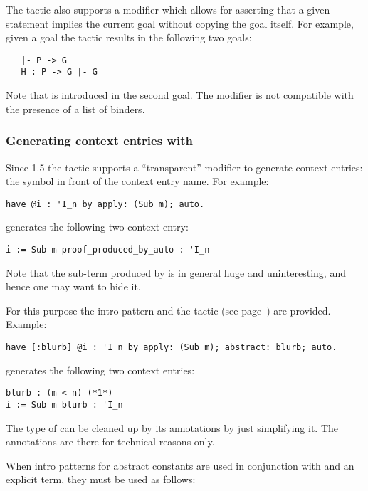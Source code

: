 The  tactic also supports a  modifier which allows for
asserting that a given statement implies the current goal without
copying the goal itself. For example, given a goal  the tactic
 results in the following two goals:
\begin{lstlisting}
   |- P -> G
   H : P -> G |- G
\end{lstlisting}
Note that  is introduced in the second goal. The 
modifier is not compatible with the presence of a list of binders.

\subsubsection*{Generating  context entries with }
\label{sec:havetransparent}

Since \ssr{} 1.5 the  tactic supports a ``transparent'' modifier to
generate  context entries: the  symbol in front of the context
entry name.  For example:

\begin{lstlisting}
have @i : 'I_n by apply: (Sub m); auto.
\end{lstlisting}
generates the following two context entry:
\begin{lstlisting}
i := Sub m proof_produced_by_auto : 'I_n
\end{lstlisting}

Note that the sub-term produced by  is in general huge and
uninteresting, and hence one may want to hide it.

For this purpose the \ssrC{[: name ]} intro pattern and the tactic
 (see page~\pageref{ssec:abstract}) are provided.
Example:
\begin{lstlisting}
have [:blurb] @i : 'I_n by apply: (Sub m); abstract: blurb; auto.
\end{lstlisting}
generates the following two context entries:
\begin{lstlisting}
blurb : (m < n) (*1*)
i := Sub m blurb : 'I_n
\end{lstlisting}
The type of  can be cleaned up by its annotations by just simplifying
it.  The annotations are there for technical reasons only.

When intro patterns for abstract constants are used in conjunction
with  and an explicit term, they must be used as follows:

